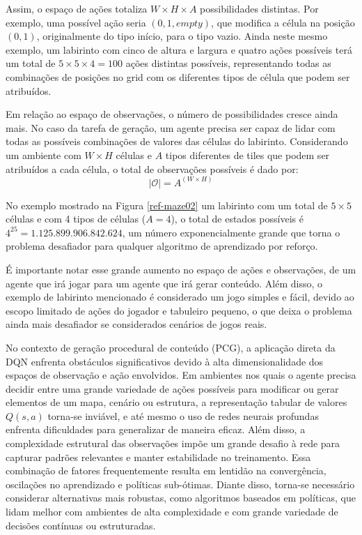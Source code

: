 Assim, o espaço de ações totaliza \(W \times H \times A\) possibilidades distintas. Por exemplo, 
uma possível ação seria \((0, 1, empty)\), que modifica a célula na posição \((0,1)\), originalmente do tipo início, 
para o tipo vazio. Ainda neste mesmo exemplo, um labirinto com cinco de altura e largura e quatro
ações possíveis terá um total de \(5 \times 5 \times 4 = 100\) ações distintas possíveis,
representando todas as combinações de posições no grid com os diferentes tipos de célula 
que podem ser atribuídos. 

Em relação ao espaço de observações, o número de possibilidades cresce ainda mais. No caso da tarefa de 
geração, um agente precisa ser capaz de lidar com todas as possíveis combinações de valores das células 
do labirinto. Considerando um ambiente com \(W \times H\) células e \(A\) tipos diferentes de tiles que 
podem ser atribuídos a cada célula, o total de observações possíveis é dado por:
\[
|\mathcal{O}| = A^{(W \times H)}
\]

No exemplo mostrado na Figura \ref{ref-maze02} um labirinto com um total de \(5 \times 5\) células e com 4 tipos 
de células (\(A = 4\)), o total de estados possíveis 
é \(4^{25} = 1.125.899.906.842.624\), um número exponencialmente grande que torna o problema desafiador para 
qualquer algoritmo de aprendizado por reforço.

É importante notar esse grande aumento no espaço de ações e observações, de um agente que irá jogar para um
agente que irá gerar conteúdo. Além disso, o exemplo de labirinto mencionado é considerado um jogo simples
e fácil, devido ao escopo limitado de ações do jogador e tabuleiro pequeno, o que deixa o problema ainda mais
desafiador se considerados cenários de jogos reais.

No contexto de geração procedural de conteúdo (PCG), a aplicação direta da DQN enfrenta obstáculos significativos 
devido à alta dimensionalidade dos espaços de observação e ação envolvidos. Em ambientes nos quais o agente precisa 
decidir entre uma grande variedade de ações possíveis para modificar ou gerar elementos de um mapa, cenário ou estrutura, 
a representação tabular de valores \(Q(s, a)\) torna-se inviável, e até mesmo o uso de redes neurais profundas enfrenta 
dificuldades para generalizar de maneira eficaz. Além disso, a complexidade estrutural das observações impõe um grande desafio 
à rede para capturar padrões relevantes e manter estabilidade no treinamento. Essa combinação de fatores frequentemente 
resulta em lentidão na convergência, oscilações no aprendizado e políticas sub-ótimas. Diante disso, torna-se necessário 
considerar alternativas mais robustas, como algoritmos baseados em políticas, que lidam melhor com ambientes de alta complexidade 
e com grande variedade de decisões contínuas ou estruturadas.

